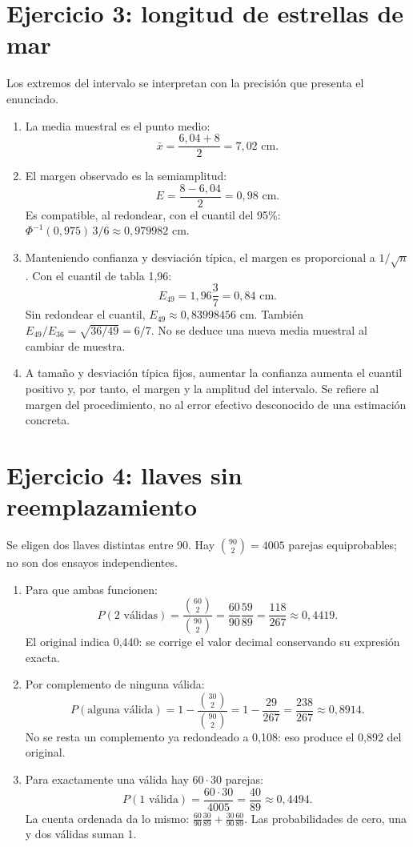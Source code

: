 \documentclass[11pt]{article}
\begin{document}
\section*{Ejercicio 3: longitud de estrellas de mar}
Los extremos del intervalo se interpretan con la precisión que presenta el enunciado.
\begin{enumerate}[label=(\alph*)]
\item La media muestral es el punto medio:
\[
\bar x=\frac{6,04+8}{2}=\boxed{7,02\text{ cm}}.
\]
\item El margen observado es la semiamplitud:
\[
E=\frac{8-6,04}{2}=\boxed{0,98\text{ cm}}.
\]
Es compatible, al redondear, con el cuantil del 95\%: $\Phi^{-1}(0,975)\,3/6\approx0,979982$ cm.
\item Manteniendo confianza y desviación típica, el margen es proporcional a $1/\sqrt n$. Con el cuantil de tabla 1,96:
\[
E_{49}=1,96\frac3{7}=\boxed{0,84\text{ cm}}.
\]
Sin redondear el cuantil, $E_{49}\approx0,83998456$ cm. También $E_{49}/E_{36}=\sqrt{36/49}=6/7$. No se deduce una nueva media muestral al cambiar de muestra.
\item A tamaño y desviación típica fijos, aumentar la confianza aumenta el cuantil positivo y, por tanto, el margen y la amplitud del intervalo. Se refiere al margen del procedimiento, no al error efectivo desconocido de una estimación concreta.
\end{enumerate}
\clearpage
\section*{Ejercicio 4: llaves sin reemplazamiento}
Se eligen dos llaves distintas entre 90. Hay $\binom{90}{2}=4005$ parejas equiprobables; no son dos ensayos independientes.
\begin{enumerate}[label=(\alph*)]
\item Para que ambas funcionen:
\[
P(2\text{ válidas})=\frac{\binom{60}{2}}{\binom{90}{2}}
=\frac{60}{90}\frac{59}{89}=\boxed{\frac{118}{267}}\approx0,4419.
\]
El original indica 0,440: se corrige el valor decimal conservando su expresión exacta.
\item Por complemento de ninguna válida:
\[
P(\text{alguna válida})=1-\frac{\binom{30}{2}}{\binom{90}{2}}
=1-\frac{29}{267}=\boxed{\frac{238}{267}}\approx0,8914.
\]
No se resta un complemento ya redondeado a 0,108: eso produce el 0,892 del original.
\item Para exactamente una válida hay $60\cdot30$ parejas:
\[
P(1\text{ válida})=\frac{60\cdot30}{4005}
=\boxed{\frac{40}{89}}\approx0,4494.
\]
La cuenta ordenada da lo mismo: $\frac{60}{90}\frac{30}{89}+\frac{30}{90}\frac{60}{89}$. Las probabilidades de cero, una y dos válidas suman 1.
\end{enumerate}
\clearpage
\end{document}

